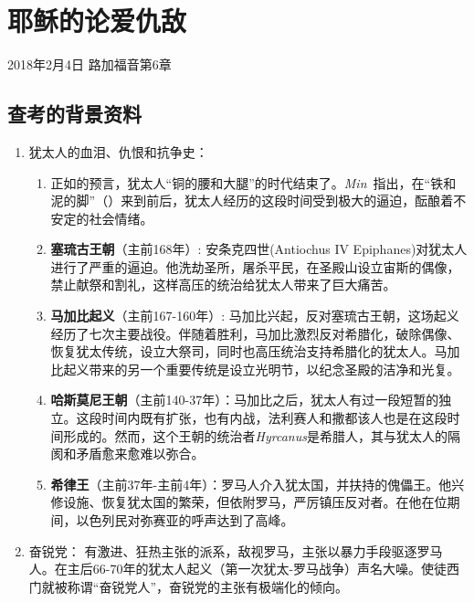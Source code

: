 \chapter{耶稣的论爱仇敌}

2018年2月4日 \hfill 路加福音第6章


\section{查考的背景资料}

\begin{enumerate}
  \item 犹太人的血泪、仇恨和抗争史：
  \begin{enumerate}
    \item 正如的预言，犹太人“铜的腰和大腿”的时代结束了。\textit{Min}~\cite{book:minMessiah}指出，在“铁和泥的脚”（）来到前后，犹太人经历的这段时间受到极大的逼迫，酝酿着不安定的社会情绪。
    \item \textbf{塞琉古王朝}（主前168年）: 安条克四世(Antiochus IV Epiphanes)对犹太人进行了严重的逼迫。他洗劫圣所，屠杀平民，在圣殿山设立宙斯的偶像，禁止献祭和割礼，这样高压的统治给犹太人带来了巨大痛苦。\cite{wiki:Maccabean, wiki:Hasmonean}
    \item \textbf{马加比起义}（主前167-160年）: 马加比兴起，反对塞琉古王朝，这场起义经历了七次主要战役。伴随着胜利，马加比激烈反对希腊化，破除偶像、恢复犹太传统，设立大祭司，同时也高压统治支持希腊化的犹太人\cite{wiki:Maccabean}。马加比起义带来的另一个重要传统是设立光明节\cite{wiki:Hanukkah}，以纪念圣殿的洁净和光复。
    \item \textbf{哈斯莫尼王朝}（主前140-37年）：马加比之后，犹太人有过一段短暂的独立。这段时间内既有扩张，也有内战，法利赛人和撒都该人也是在这段时间形成的。然而，这个王朝的统治者\textit{Hyrcanus}是希腊人，其与犹太人的隔阂和矛盾愈来愈难以弥合。
    \item \textbf{希律王}（主前37年-主前4年）：罗马人介入犹太国，并扶持的傀儡王。他兴修设施、恢复犹太国的繁荣，但依附罗马，严厉镇压反对者。在他在位期间，以色列民对弥赛亚的呼声达到了高峰。
  \end{enumerate}
  \item 奋锐党：
  有激进、狂热主张的派系，敌视罗马，主张以暴力手段驱逐罗马人。在主后66-70年的犹太人起义（第一次犹太-罗马战争）声名大噪。使徒西门就被称谓“奋锐党人”，奋锐党的主张有极端化的倾向。\cite{wiki:Zealots}
\end{enumerate}


